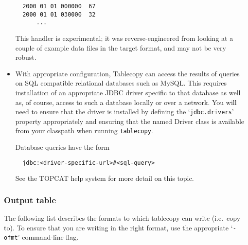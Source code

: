 \documentclass[twoside,11pt]{article}
\newcommand{\xlabel}[1]{}
\renewcommand{\_}{\texttt{\symbol{95}}}
\begin{document}
\begin{itemize}
\begin{verbatim}
  2000 01 01 000000  67
  2000 01 01 030000  32
      ...
\end{verbatim}
This handler is experimental; it was reverse-engineered from looking
at a couple of example data files in the target format, and may
not be very robust.


\item With appropriate configuration, Tablecopy can access the 
results of queries on SQL compatible relational databases such as 
MySQL. This requires installation of an appropriate JDBC driver 
specific to that database as well as, of course, access to such a 
database locally or over a network. You will need to ensure that
the driver is installed by defining the `\texttt{jdbc.drivers}' property
appropriately and ensuring that the named Driver class is available 
from your classpath when running \texttt{tablecopy}.

Database queries have the form
\begin{verbatim}
  jdbc:<driver-specific-url>#<sql-query>
\end{verbatim}

See the TOPCAT help system for more detail on this topic.
\end{itemize}

\subsubsection{\label{output}\xlabel{output}Output table}

The following list describes the formats to which tablecopy
can write (i.e.\ copy to).  To ensure that you are writing in the right format,
use the appropriate `\texttt{-ofmt}' command-line flag.
\end{document}
